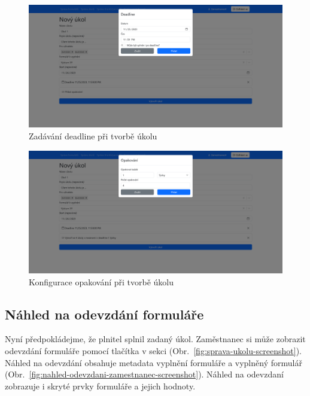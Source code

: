 \begin{figure}[H]
    \includegraphics[width=\textwidth]{../img/screenshots/tvorba-ukolu-deadline}
    \caption{Zadávání deadline při tvorbě úkolu}\label{fig:tvorba-ukolu-deadline-screenshot}
\end{figure}

\begin{figure}[H]
    \includegraphics[width=\textwidth]{../img/screenshots/tvorba-ukolu-opakovani}
    \caption{Konfigurace opakování při tvorbě úkolu}\label{fig:tvorba-ukolu-opakovani-screenshot}
\end{figure}

\subsection{Náhled na odevzdání formuláře}\label{subsec:nahled-odevzdani-formulare}

Nyní předpokládejme, že plnitel splnil zadaný úkol.
Zaměstnanec si může zobrazit odevzdání formuláře pomocí tlačítka  v sekci  (Obr.~\ref{fig:sprava-ukolu-screenshot}).
Náhled na odevzdání obsahuje metadata vyplnění formuláře a vyplněný formulář (Obr.~\ref{fig:nahled-odevzdani-zamestnanec-screenshot}).
Náhled na odevzdaní zobrazuje i skryté prvky formuláře a jejich hodnoty.

